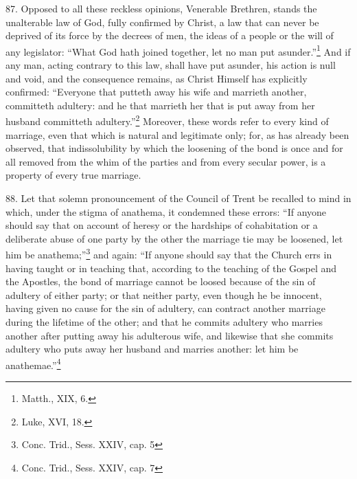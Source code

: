 \documentclass[12pt,a4paper]{book}
\begin{document}
87. Opposed to all these reckless opinions, Venerable Brethren, stands the unalterable law of God, fully confirmed by Christ, a law that can never be deprived of its force by the decrees of men, the ideas of a people or the will of any legislator: ``What God hath joined together, let no man put asunder.''\footnote{Matth., XIX, 6.} And if any man, acting contrary to this law, shall have put asunder, his action is null and void, and the consequence remains, as Christ Himself has explicitly confirmed: ``Everyone that putteth away his wife and marrieth another, committeth adultery: and he that marrieth her that is put away from her husband committeth adultery.''\footnote{Luke, XVI, 18.} Moreover, these words refer to every kind of marriage, even that which is natural and legitimate only; for, as has already been observed, that indissolubility by which the loosening of the bond is once and for all removed from the whim of the parties and from every secular power, is a property of every true marriage.

88. Let that solemn pronouncement of the Council of Trent be recalled to mind in which, under the stigma of anathema, it condemned these errors: ``If anyone should say that on account of heresy or the hardships of cohabitation or a deliberate abuse of one party by the other the marriage tie may be loosened, let him be anathema;''\footnote{Conc. Trid., Sess. XXIV, cap. 5} and again: ``If anyone should say that the Church errs in having taught or in teaching that, according to the teaching of the Gospel and the Apostles, the bond of marriage cannot be loosed because of the sin of adultery of either party; or that neither party, even though he be innocent, having given no cause for the sin of adultery, can contract another marriage during the lifetime of the other; and that he commits adultery who marries another after putting away his adulterous wife, and likewise that she commits adultery who puts away her husband and marries another: let him be anathemae.''\footnote{Conc. Trid., Sess. XXIV, cap. 7}
\end{document}
